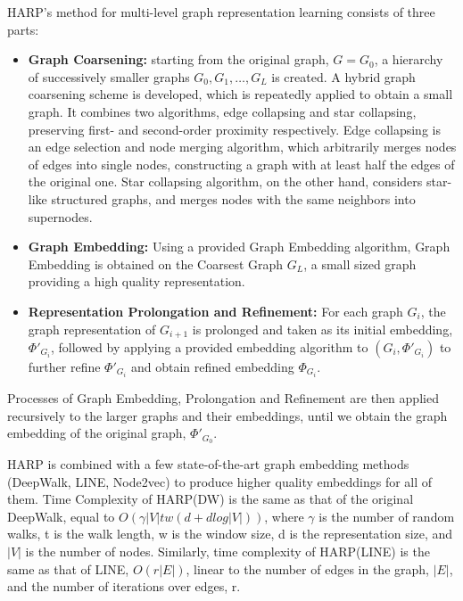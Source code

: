 HARP's method for multi-level graph representation learning consists of three parts:
\begin{itemize}
\item \textbf{Graph Coarsening:} starting from the original graph, $G = G_0$, a hierarchy of successively smaller graphs $G_0, G_1, \dots , G_L$ is created. A hybrid graph coarsening scheme is developed, which is repeatedly applied to obtain a small graph. It combines two algorithms, edge collapsing and star collapsing, preserving first- and second-order proximity respectively. Edge collapsing is an edge selection and node merging algorithm, which arbitrarily merges nodes of edges into single nodes, constructing a graph with at least half the edges of the original one. Star collapsing algorithm, on the other hand, considers star-like structured graphs, and merges nodes with the same neighbors into supernodes.
     \item \textbf{Graph Embedding:}  Using a provided Graph Embedding algorithm, Graph Embedding is obtained on the Coarsest Graph $G_L$, a small sized graph providing a high quality representation.
     \item \textbf{Representation Prolongation and Refinement:} For each graph $G_i$, the graph representation of $G_{i+1}$ is prolonged and taken as its initial embedding, $\Phi'_{G_i}$, followed by applying a provided embedding algorithm to $(G_i, \Phi'_{G_i})$ to further refine $\Phi'_{G_i}$ and obtain refined embedding $\Phi_{G_i}$.
\end{itemize}

Processes of Graph Embedding, Prolongation and Refinement are then applied recursively to the larger graphs and their embeddings, until we obtain the graph embedding of the original graph, $\Phi'_{G_0}$.

HARP is combined with a few state-of-the-art graph embedding methods (DeepWalk, LINE, Node2vec) to produce higher quality embeddings for all of them.
Time Complexity of HARP(DW) is the same as that of the original DeepWalk, equal to $O(\gamma |V|tw (d+dlog|V|))$, where $\gamma$ is the number of random walks, t is the  walk length, w is the window size, d is the representation size, and $|V|$ is the number of nodes. Similarly, time complexity of HARP(LINE) is the same as that of LINE, $O(r|E|)$,  linear to the number of edges in the graph, $|E|$, and the number of iterations over edges, r.
